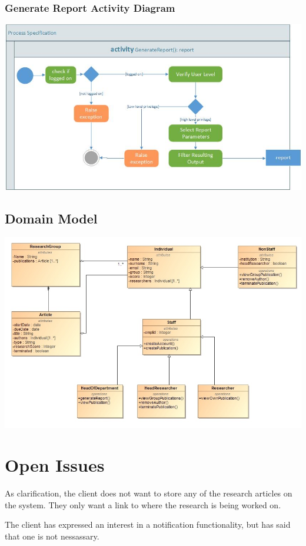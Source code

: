 \documentclass[a4paper,12pt]{article}
\begin{document}
	\subsubsection{Generate Report Activity Diagram}
	\includegraphics[width=1\textwidth]{./activity_generate_report.jpg}\\[1.5cm]

\subsection{Domain Model}
	\includegraphics[width=1\textwidth]{./Domain.jpg}\\[1.5cm]
\newpage
\section{Open Issues}
As clarification, the client does not want to store any of the research articles on the system. They only want a link to where the research is being worked on.

The client has expressed an interest in a notification functionality, but has said that one is not nessassary.
\end{document}

